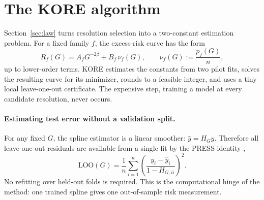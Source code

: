 \documentclass{article}
\newcommand{\KORE}{\textsc{KORE}}
\newcommand{\LoO}{\mathrm{LOO}}
\begin{document}
\section{The \KORE{} algorithm}
\label{sec:algorithm}

Section~\ref{sec:law} turns resolution selection into a two-constant estimation problem. For a fixed family $f$, the excess-risk curve has the form
\[
    R_f(G)=A_fG^{-2\beta}+B_f\,\nu_f(G),
    \qquad
    \nu_f(G):=\frac{p_f(G)}{n},
\]
up to lower-order terms. \KORE{} estimates the constants from two pilot fits, solves the resulting curve for its minimizer, rounds to a feasible integer, and uses a tiny local leave-one-out certificate. The expensive step, training a model at every candidate resolution, never occurs.

\paragraph{Estimating test error without a validation split.}
For any fixed $G$, the spline estimator is a linear smoother: $\hat y=H_Gy$. Therefore all leave-one-out residuals are available from a single fit by the PRESS identity \citep{allen1974},
\begin{equation}
    \LoO(G)=\frac{1}{n}\sum_{i=1}^{n}\left(\frac{y_i-\hat y_i}{1-H_{G,ii}}\right)^2.
    \label{eq:loo}
\end{equation}
No refitting over held-out folds is required. This is the computational hinge of the method: one trained spline gives one out-of-sample risk measurement.
\end{document}
